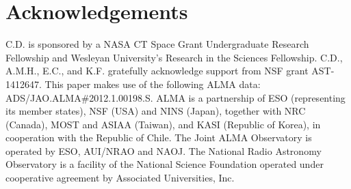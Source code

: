 \documentclass[modern]{aastex62}
\begin{document}
\section*{Acknowledgements}
C.D. is sponsored by a NASA CT Space Grant Undergraduate Research Fellowship and Wesleyan University's Research in the Sciences Fellowship.  
C.D., A.M.H., E.C., and K.F. gratefully acknowledge support from NSF grant AST-1412647.  
This paper makes use of the following ALMA data:  ADS/JAO.ALMA\#2012.1.00198.S.  
ALMA is a partnership of ESO (representing its member states), NSF (USA) and NINS (Japan), together with NRC (Canada), MOST and ASIAA (Taiwan), and KASI (Republic of Korea), in cooperation with the Republic of Chile.  
The Joint ALMA Observatory is operated by ESO, AUI/NRAO and NAOJ.  
The National Radio Astronomy Observatory is a facility of the National Science Foundation operated under cooperative agreement by Associated Universities, Inc.

\clearpage

\end{document}

